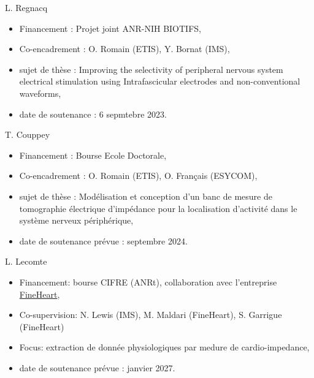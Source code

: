 
\begin{cvskills}
  \cvskill
    {L. Regnacq} %
    {\begin{itemize}
    	\item Financement : Projet joint ANR-NIH BIOTIFS,
    	\item Co-encadrement : O. Romain (ETIS), Y. Bornat (IMS),
    	\item sujet de thèse : Improving the selectivity of peripheral nervous system electrical stimulation using Intrafascicular electrodes and non-conventional waveforms,
    	\item date de soutenance : 6 sepmtebre 2023.
    \end{itemize}
    } %
  \cvskill
    {T. Couppey} %
    {\begin{itemize}
    	\item Financement : Bourse Ecole Doctorale,
    	\item Co-encadrement : O. Romain (ETIS), O. Français (ESYCOM),
    	\item sujet de thèse : Modélisation et conception d'un banc de mesure de tomographie électrique d'impédance pour la localisation d'activité dans le système nerveux périphérique,
    	\item date de soutenance prévue : septembre 2024.
    \end{itemize}
    } %
  \cvskill
    {L. Lecomte} %
    {\begin{itemize}
    	\item Financement: bourse CIFRE (ANRt), collaboration avec l'entreprise \href{http://fineheart.fr}{FineHeart},
    	\item Co-supervision: N. Lewis (IMS), M. Maldari (FineHeart), S. Garrigue (FineHeart)
    	\item Focus: extraction de donnée physiologiques par medure de cardio-impedance,
    	\item date de soutenance prévue : janvier 2027.
    \end{itemize}
    } %
\end{cvskills}


